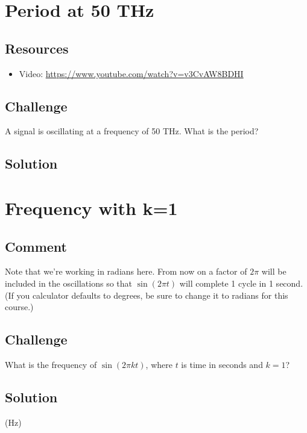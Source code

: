 \section{Period at 50 THz}

\subsection*{Resources}
\begin{itemize}
    \item Video: \url{https://www.youtube.com/watch?v=v3CvAW8BDHI}
\end{itemize}

\subsection*{Challenge}
A signal is oscillating at a frequency of 50 THz.  What is the period?

\subsection*{Solution}




\newpage

\section{Frequency with k=1}

\subsection*{Comment}
Note that we're working in radians here. From now on a factor of $2 \pi$ will be included in the oscillations so that $\sin(2 \pi t)$ will complete 1 cycle in 1 second.  (If you calculator defaults to degrees, be sure to change it to radians for this course.)

\subsection*{Challenge}
What is the frequency of $\sin(2 \pi k t)$, where $t$ is time in seconds and $k=1$?

\subsection*{Solution}
(Hz)

